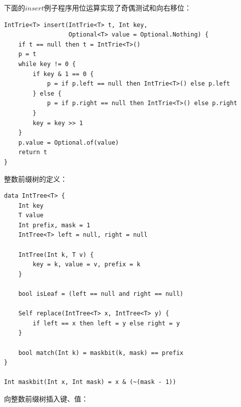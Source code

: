 \documentclass[b5paper]{ctexart}
\begin{document}
下面的$insert$例子程序用位运算实现了奇偶测试和向右移位：

\begin{lstlisting}[language = Bourbaki]
IntTrie<T> insert(IntTrie<T> t, Int key,
                  Optional<T> value = Optional.Nothing) {
    if t == null then t = IntTrie<T>()
    p = t
    while key != 0 {
        if key & 1 == 0 {
            p = if p.left == null then IntTrie<T>() else p.left
        } else {
            p = if p.right == null then IntTrie<T>() else p.right
        }
        key = key >> 1
    }
    p.value = Optional.of(value)
    return t
}
\end{lstlisting}



整数前缀树的定义：

\begin{lstlisting}[language = Bourbaki]
data IntTree<T> {
    Int key
    T value
    Int prefix, mask = 1
    IntTree<T> left = null, right = null

    IntTree(Int k, T v) {
        key = k, value = v, prefix = k
    }

    bool isLeaf = (left == null and right == null)

    Self replace(IntTree<T> x, IntTree<T> y) {
        if left == x then left = y else right = y
    }

    bool match(Int k) = maskbit(k, mask) == prefix
}

Int maskbit(Int x, Int mask) = x & (~(mask - 1))
\end{lstlisting}

向整数前缀树插入键、值：
\end{document}

